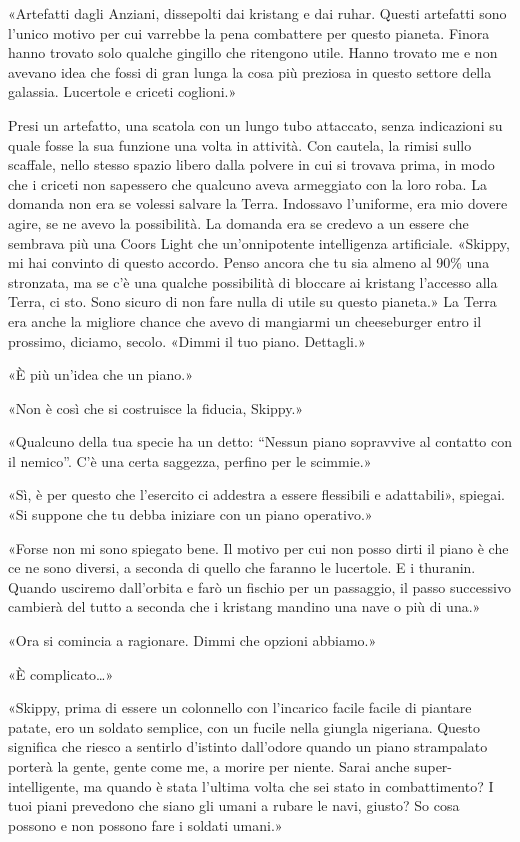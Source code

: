 «Artefatti dagli Anziani, dissepolti dai kristang e dai ruhar. Questi
artefatti sono l'unico motivo per cui varrebbe la pena combattere per
questo pianeta. Finora hanno trovato solo qualche gingillo che ritengono
utile. Hanno trovato me e non avevano idea che fossi di gran lunga la
cosa più preziosa in questo settore della galassia. Lucertole e criceti
coglioni.»

Presi un artefatto, una scatola con un lungo tubo attaccato, senza
indicazioni su quale fosse la sua funzione una volta in attività. Con
cautela, la rimisi sullo scaffale, nello stesso spazio libero dalla
polvere in cui si trovava prima, in modo che i criceti non sapessero che
qualcuno aveva armeggiato con la loro roba. La domanda non era se
volessi salvare la Terra. Indossavo l'uniforme, era mio dovere agire, se
ne avevo la possibilità. La domanda era se credevo a un essere che
sembrava più una Coors Light che un'onnipotente intelligenza
artificiale. «Skippy, mi hai convinto di questo accordo. Penso ancora
che tu sia almeno al 90\% una stronzata, ma se c'è una qualche
possibilità di bloccare ai kristang l'accesso alla Terra, ci sto. Sono
sicuro di non fare nulla di utile su questo pianeta.» La Terra era anche
la migliore chance che avevo di mangiarmi un cheeseburger entro il
prossimo, diciamo, secolo. «Dimmi il tuo piano. Dettagli.»

«È più un'idea che un piano.»

«Non è così che si costruisce la fiducia, Skippy.»

«Qualcuno della tua specie ha un detto: ``Nessun piano sopravvive al
contatto con il nemico''. C'è una certa saggezza, perfino per le
scimmie.»

«Sì, è per questo che l'esercito ci addestra a essere flessibili e
adattabili», spiegai. «Si suppone che tu debba iniziare con un piano
operativo.»

«Forse non mi sono spiegato bene. Il motivo per cui non posso dirti il
piano è che ce ne sono diversi, a seconda di quello che faranno le
lucertole. E i thuranin. Quando usciremo dall'orbita e farò un fischio
per un passaggio, il passo successivo cambierà del tutto a seconda che i
kristang mandino una nave o più di una.»

«Ora si comincia a ragionare. Dimmi che opzioni abbiamo.»

«È complicato\ldots»

«Skippy, prima di essere un colonnello con l'incarico facile facile di
piantare patate, ero un soldato semplice, con un fucile nella giungla
nigeriana. Questo significa che riesco a sentirlo d'istinto dall'odore
quando un piano strampalato porterà la gente, gente come me, a morire
per niente. Sarai anche super-intelligente, ma quando è stata l'ultima
volta che sei stato in combattimento? I tuoi piani prevedono che siano
gli umani a rubare le navi, giusto? So cosa possono e non possono fare i
soldati umani.»

